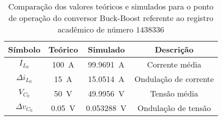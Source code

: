 \begin{table}[!ht]
\centering
\caption{Comparação dos valores teóricos e simulados para o ponto de operação do conversor Buck-Boost referente ao registro acadêmico de número $1438336$}
\label{tab:steadystatesim}
\begin{tabular}{@{}cccc@{}}
\toprule
\textbf{Símbolo} & \textbf{Teórico} & \textbf{Simulado} & \textbf{Descrição}\\ \midrule
$I_{L_0}$ & \SI{100}{\A} & \SI{99.9691}{\A} & Corrente média\\
$\Delta{i_{L_0}}$  & \SI{15}{\A} & \SI{15.0514}{\A}& Ondulação de corrente\\
$V_{C_0}$ & \SI{50}{\V} & \SI{49.9956}{\V} & Tensão média\\
$\Delta{v_{C_0}}$  & \SI{0.05}{\V} & \SI{0.053288}{\V}& Ondulação de tensão \\
\bottomrule
\end{tabular}
\end{table}

